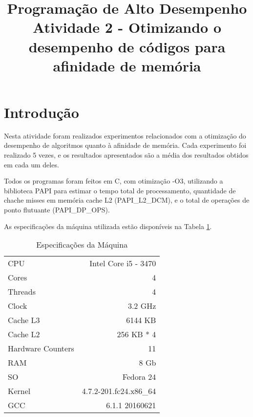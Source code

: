 \documentclass[conference]{IEEEtran}
\begin{document}
\title{Programação de Alto Desempenho\\
\large Atividade 2 - Otimizando o desempenho de códigos para afinidade de memória}

\author{
 }

\maketitle


\section{Introdução}
Nesta atividade foram realizados experimentos relacionados com a otimização do desempenho de algoritmos quanto à afinidade de memória.
Cada experimento foi realizado 5 vezes, e os resultados apresentados são a média dos resultados obtidos em cada um deles.

Todos os programas foram feitos em C, com otimização -O3, utilizando a biblioteca PAPI para estimar o tempo total de processamento, quantidade de chache misses em memória cache L2 (PAPI\_L2\_DCM), e o total de operações de ponto flutuante (PAPI\_DP\_OPS).


As especificações da máquina utilizada estão disponíveis na Tabela \ref{tab:cpu}.

\begin{table}[htb!]
\centering
\caption{Especificações da Máquina}
\label{tab:cpu}
\begin{tabular}{lr}
 CPU & Intel Core i5 - 3470\\
 Cores & 4\\
 Threads & 4\\
 Clock & 3.2 GHz\\
 Cache L3 & 6144 KB \\
 Cache L2 & 256 KB * 4 \\
 Hardware Counters & 11 \\
 RAM & 8 Gb \\
 SO & Fedora 24 \\
 Kernel & 4.7.2-201.fc24.x86\_64 \\
 GCC & 6.1.1 20160621\\

\end{tabular}
\end{table}
\end{document}
